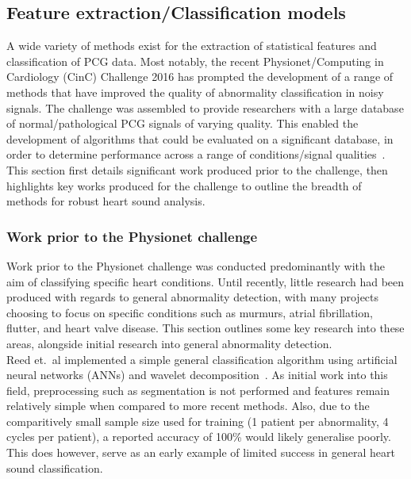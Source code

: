 \documentclass[titlepage, 12pt]{scrartcl} \usepackage{enumitem}
\begin{document}
\doublespacing

\subsection{Feature extraction/Classification models}\label{Classification}

A wide variety of methods exist for the extraction of statistical features and
classification of PCG data. Most notably, the recent Physionet/Computing in
Cardiology (CinC) Challenge 2016 has prompted the development of a range of
methods that have improved the quality of abnormality classification in noisy
signals.  The challenge was assembled to provide researchers with a large
database of normal/pathological PCG signals of varying quality. This enabled
the development of algorithms that could be evaluated on a significant
database, in order to determine performance across a range of conditions/signal
qualities~\parencite{Clifford2016}. This section first details significant work
produced prior to the challenge, then highlights key works produced for the
challenge to outline the breadth of methods for robust heart sound analysis.

\subsubsection{Work prior to the Physionet challenge}
Work prior to the Physionet challenge was conducted predominantly with the aim
of classifying specific heart conditions. Until recently, little research had
been produced with regards to general abnormality detection, with many projects
choosing to focus on specific conditions such as murmurs, atrial fibrillation,
flutter, and heart valve disease. This section outlines some key research
into these areas, alongside initial research into general abnormality
detection.\\

Reed et.\ al implemented a simple general classification algorithm using artificial
neural networks (ANNs) and wavelet decomposition~\parencite{Reed2004}. As
initial work into this field, preprocessing such as segmentation is not
performed and features remain relatively simple when compared to more recent
methods. Also, due to the comparitively small sample size used for training (1
patient per abnormality, 4 cycles per patient), a reported accuracy of 100\%
would likely generalise poorly. This does however, serve as an early example of
limited success in general heart sound classification.\\
\end{document}

